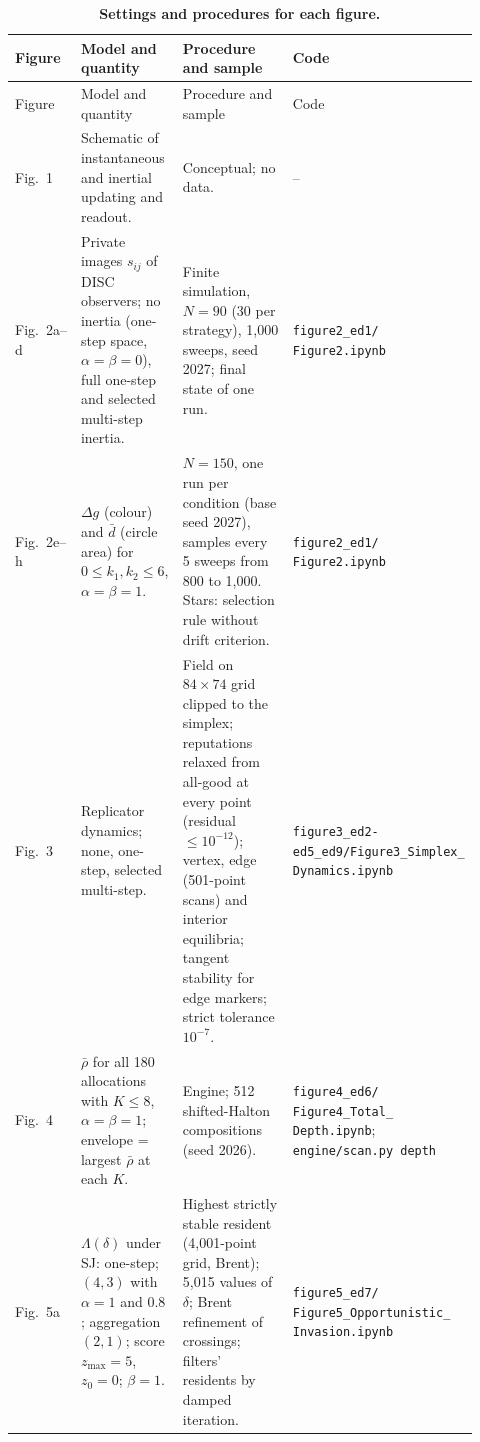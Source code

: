 \documentclass[fleqn,10pt]{article}
\theoremstyle{plain}
\theoremstyle{remark}
\newcommand{\FigModel}{1}
\newcommand{\FigRecognition}{2}
\newcommand{\FigStrategy}{3}
\newcommand{\FigDepth}{4}
\newcommand{\FigOpportunism}{5}
\begin{document}
{\small
\begin{longtable}{@{}>{\raggedright\arraybackslash}p{0.12\linewidth}>{\raggedright\arraybackslash}p{0.24\linewidth}>{\raggedright\arraybackslash}p{0.32\linewidth}>{\raggedright\arraybackslash}p{0.24\linewidth}@{}}
\caption{\textbf{Settings and procedures for each figure.}}\label{tab:figures}\\
\toprule
Figure & Model and quantity & Procedure and sample & Code\\
\midrule
\endfirsthead
\toprule
Figure & Model and quantity & Procedure and sample & Code\\
\midrule
\endhead
\bottomrule
\endfoot
Fig.~\FigModel & Schematic of instantaneous and inertial updating and readout. & Conceptual; no data. & --\\
Fig.~\FigRecognition a--d & Private images $s_{ij}$ of DISC observers; no inertia (one-step space, $\alpha=\beta=0$), full one-step and selected multi-step inertia. & Finite simulation, $N=90$ (30 per strategy), 1,000 sweeps, seed 2027; final state of one run. & \texttt{figure2\_ed1/ Figure2.ipynb}\\
Fig.~\FigRecognition e--h & $\Delta g$ (colour) and $\bar d$ (circle area) for $0\le k_1,k_2\le6$, $\alpha=\beta=1$. & $N=150$, one run per condition (base seed 2027), samples every 5 sweeps from 800 to 1,000. Stars: selection rule without drift criterion. & \texttt{figure2\_ed1/ Figure2.ipynb}\\
Fig.~\FigStrategy & Replicator dynamics; none, one-step, selected multi-step. & Field on $84\times74$ grid clipped to the simplex; reputations relaxed from all-good at every point (residual $\le10^{-12}$); vertex, edge (501-point scans) and interior equilibria; tangent stability for edge markers; strict tolerance $10^{-7}$. & \texttt{figure3\_ed2-ed5\_ed9/\allowbreak Figure3\_Simplex\_ Dynamics.ipynb}\\
Fig.~\FigDepth & $\bar\rho$ for all 180 allocations with $K\le8$, $\alpha=\beta=1$; envelope = largest $\bar\rho$ at each $K$. & Engine; 512 shifted-Halton compositions (seed 2026). & \texttt{figure4\_ed6/ Figure4\_Total\_ Depth.ipynb}; \texttt{engine/scan.py depth}\\
Fig.~\FigOpportunism a & $\Lambda(\delta)$ under SJ: one-step; $(4,3)$ with $\alpha=1$ and $0.8$; aggregation $(2,1)$; score $z_{\max}=5$, $z_0=0$; $\beta=1$. & Highest strictly stable resident (4,001-point grid, Brent); 5,015 values of $\delta$; Brent refinement of crossings; filters' residents by damped iteration. & \texttt{figure5\_ed7/ Figure5\_Opportunistic\_ Invasion.ipynb}\\

\end{longtable}}
\end{document}
